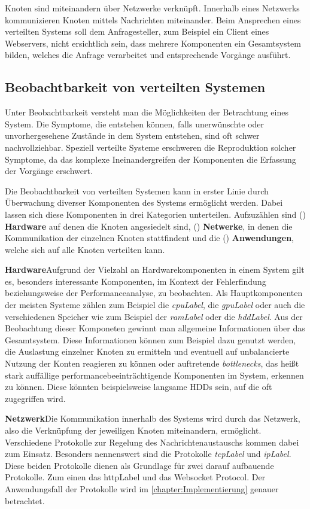 	Knoten sind miteinandern über Netzwerke verknüpft. Innerhalb eines Netzwerks kommunizieren Knoten mittels Nachrichten miteinander. Beim Ansprechen eines verteilten Systems soll dem Anfragesteller, zum Beispiel ein Client eines Webservers, nicht ersichtlich sein, dass mehrere Komponenten ein Gesamtsystem bilden, welches die Anfrage verarbeitet und entsprechende Vorgänge ausführt. 
\subsection{Beobachtbarkeit von verteilten Systemen}
\label{subsection:Beobachtbarkeit von verteilten Systemen}
	Unter Beobachtbarkeit versteht man die Möglichkeiten der Betrachtung eines System. Die Symptome, die entstehen können, falls unerwünschte oder unvorhergesehene Zustände in dem System entstehen, sind oft schwer nachvollziehbar. Speziell verteilte Systeme erschweren die Reproduktion solcher Symptome, da das komplexe Ineinandergreifen der Komponenten die Erfassung der Vorgänge erschwert. 

	Die Beobachtbarkeit von verteilten Systemen kann in erster Linie durch Überwachung diverser Komponenten des Systems ermöglicht werden. Dabei lassen sich diese Komponenten in drei Kategorien unterteilen. Aufzuzählen sind () \textbf{Hardware} auf denen die Knoten angesiedelt sind, () \textbf{Netwerke}, in denen die Kommunikation der einzelnen Knoten stattfindent und die () \textbf{Anwendungen}, welche sich auf alle Knoten verteilten kann.

	
	\textbf{Hardware}\space\space\space Aufgrund der Vielzahl an Hardwarekomponenten in einem System gilt es, besonders interessante Komponenten, im Kontext der Fehlerfindung beziehungsweise der Performanceanalyse, zu beobachten. Als Hauptkomponenten der meisten Systeme zählen zum Beispiel die \emph{\gls{cpuLabel}}, die \emph{\gls{gpuLabel}} oder auch die verschiedenen Speicher wie zum Beispiel der \emph{\gls{ramLabel}} oder die \emph{\gls{hddLabel}}. Aus der Beobachtung dieser Komponeten gewinnt man allgemeine Informationen über das Gesamtsystem. Diese Informationen können zum Beispiel dazu genutzt werden, die Auslastung einzelner Knoten zu ermitteln und eventuell auf unbalancierte Nutzung der Konten reagieren zu können oder auftretende \emph{bottlenecks}, das heißt stark auffällige performancebeeinträchtigende Komponenten im System, erkennen zu können. Diese könnten beispielsweise langsame HDDs sein, auf die oft zugegriffen wird.
	
	\textbf{Netzwerk}\space\space\space Die Kommunikation innerhalb des Systems wird durch das Netzwerk, also die Verknüpfung der jeweiligen Knoten miteinandern, ermöglicht. Verschiedene Protokolle zur Regelung des Nachrichtenaustauschs kommen dabei zum Einsatz. Besonders nennenswert sind die Protokolle \emph{\gls{tcpLabel}} und \emph{\gls{ipLabel}}. Diese beiden Protokolle dienen als Grundlage für zwei darauf aufbauende Protokolle. Zum einen das \gls{httpLabel} und das Websocket Protocol. Der Anwendungsfall der Protokolle wird im \cref{chapter:Implementierung} genauer betrachtet.
	
